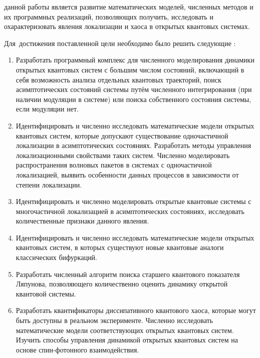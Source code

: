 {\aim} данной работы является развитие математических моделей, численных методов и их программных реализаций, позволяющих получить, исследовать и охарактеризовать явления локализации и хаоса в открытых квантовых системах.

Для~достижения поставленной цели необходимо было решить следующие {\tasks}:
\begin{enumerate}[beginpenalty=10000] %
	\item Разработать программный комплекс для численного моделирования динамики открытых квантовых систем с большим числом состояний, включающий в себя возможность анализа отдельных квантовых траекторий, поиск асимптотических состояний системы путём численного интегрирования (при наличии модуляции в системе) или поиска собственного состояния системы, если модуляции нет.
	\item Идентифицировать и численно исследовать математические модели открытых квантовых систем, которые допускают существование одночастичной локализации в асимптотических состояниях. Разработать методы управления локализационными свойствами таких систем. Численно моделировать распространения волновых пакетов в системах с одночастичной локализацией, выявить особенности данных процессов в зависимости от степени локализации.
	\item Идентифицировать и численно моделировать открытые квантовые системы с многочастичной локализацией в асимптотических состояниях, исследовать количественные признаки данного явления.
	\item Идентифицировать и численно исследовать математические модели открытых квантовых систем, в которых существуют новые квантовые аналоги классических бифуркаций.
	\item Разработать численный алгоритм поиска старшего квантового показателя Ляпунова, позволяющего количественно оценить динамику открытой квантовой системы.
	\item Разработать квантификаторы диссипативного квантового хаоса, которые могут быть доступны в реальном эксперименте. Численно исследовать математические модели соответствующих открытых квантовых систем. Изучить способы управления динамикой открытых квантовых систем на основе спин-фотонного взаимодействия. 
\end{enumerate}


